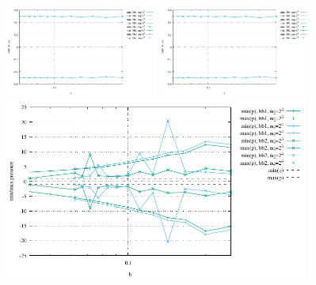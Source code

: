 \begin{center}
\includegraphics[width=5cm]{python_codes/fieldstone_75/results/mms3D/exz_stats.pdf}
\includegraphics[width=5cm]{python_codes/fieldstone_75/results/mms3D/eyz_stats.pdf}\\
\includegraphics[width=10cm]{python_codes/fieldstone_75/results/mms3D/p_stats.pdf}
\end{center}


